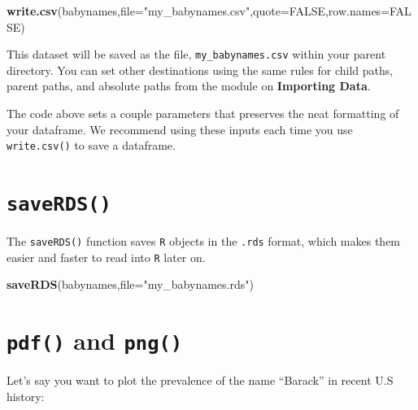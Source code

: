 \documentclass[
]{book}
\newenvironment{Shaded}{\begin{snugshade}}{\end{snugshade}}
\newcommand{\DataTypeTok}[1]{\textcolor[rgb]{0.13,0.29,0.53}{#1}}
\newcommand{\KeywordTok}[1]{\textcolor[rgb]{0.13,0.29,0.53}{\textbf{#1}}}
\newcommand{\NormalTok}[1]{#1}
\newcommand{\OtherTok}[1]{\textcolor[rgb]{0.56,0.35,0.01}{#1}}
\newcommand{\StringTok}[1]{\textcolor[rgb]{0.31,0.60,0.02}{#1}}
\begin{document}
\begin{Shaded}
\begin{Highlighting}[]
\KeywordTok{write.csv}\NormalTok{(babynames,}\DataTypeTok{file=}\StringTok{"my_babynames.csv"}\NormalTok{,}\DataTypeTok{quote=}\OtherTok{FALSE}\NormalTok{,}\DataTypeTok{row.names=}\OtherTok{FALSE}\NormalTok{)}
\end{Highlighting}
\end{Shaded}

This dataset will be saved as the file, \texttt{my\_babynames.csv} within your parent directory. You can set other destinations using the same rules for child paths, parent paths, and absolute paths from the module on \textbf{Importing Data}.

The code above sets a couple parameters that preserves the neat formatting of your dataframe. We recommend using these inputs each time you use \texttt{write.csv()} to save a dataframe.

\hypertarget{saverds}{%
\section*{\texorpdfstring{\texttt{saveRDS()}}{saveRDS()}}\label{saverds}}

The \texttt{saveRDS()} function saves \texttt{R} objects in the \texttt{.rds} format, which makes them easier and faster to read into \texttt{R} later on.

\begin{Shaded}
\begin{Highlighting}[]
\KeywordTok{saveRDS}\NormalTok{(babynames,}\DataTypeTok{file=}\StringTok{"my_babynames.rds"}\NormalTok{)}
\end{Highlighting}
\end{Shaded}

\hypertarget{pdf-and-png}{%
\section*{\texorpdfstring{\texttt{pdf()} and \texttt{png()}}{pdf() and png()}}\label{pdf-and-png}}

Let's say you want to plot the prevalence of the name ``Barack'' in recent U.S history:
\end{document}

